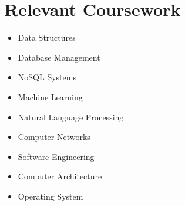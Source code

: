 \documentclass[letterpaper,11pt]{article}
\makeatletter
\newcommand{\resumeItem}[1]{
  \item\small{
    {#1 \vspace{-2pt}}
  }
}
\newcommand{\resumeSubheading}[4]{
  \vspace{-2pt}\item
    \begin{tabular*}{1.0\textwidth}[t]{l@{\extracolsep{\fill}}r}
      \textbf{#1} & \textbf{\small #2} \\
      \textit{\small#3} & \textit{\small #4} \\
    \end{tabular*}\vspace{-7pt}
}
\newcommand{\resumeSubHeadingListStart}{\begin{itemize}[leftmargin=0.0in, label={}]}
\newcommand{\resumeSubHeadingListEnd}{\end{itemize}}
\newcommand{\resumeItemListStart}{\begin{itemize}}
\newcommand{\resumeItemListEnd}{\end{itemize}\vspace{-5pt}}
\makeatother
\begin{document}
\section{Relevant Coursework}
        \begin{multicols}{3}
            \begin{itemize}[itemsep=-5pt, parsep=3pt]
                \item  Data Structures
                \item Database Management
                \item NoSQL Systems
                \item Machine Learning
                \item  Natural Language Processing
                \item Computer Networks
                \item Software Engineering
                \item Computer Architecture
                \item Operating System
            \end{itemize}
        \end{multicols}
        \vspace*{2.0\multicolsep}


        
\end{document}

